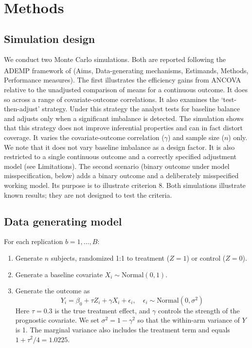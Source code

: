 \documentclass[
  11pt,
]{article}
\providecommand{\tightlist}{%
  \setlength{\itemsep}{0pt}\setlength{\parskip}{0pt}}
\begin{document}
\section{Methods}\label{methods}

\subsection{Simulation design}\label{simulation-design}

We conduct two Monte Carlo simulations. Both are
reported following the ADEMP framework of\textsuperscript{} (Aims, Data-generating
mechanisms, Estimands, Methods, Performance measures).
The first illustrates the efficiency gains from ANCOVA
relative to the unadjusted comparison of means for a
continuous outcome. It does so across a range of
covariate-outcome correlations. It also examines the
`test-then-adjust' strategy. Under this strategy the
analyst tests for baseline balance and adjusts only
when a significant imbalance is detected. The
simulation shows that this strategy does not improve
inferential properties and can in fact distort
coverage. It varies the covariate-outcome correlation
(\(\gamma\)) and sample size (\(n\)) only. We note that it
does not vary baseline imbalance as a design factor. It
is also restricted to a single continuous outcome and a
correctly specified adjustment model (see Limitations).
The second scenario (binary outcome under model
misspecification, below) adds a binary outcome and a
deliberately misspecified working model. Its purpose is
to illustrate criterion 8. Both simulations illustrate
known results; they are not designed to test the
criteria.

\subsection{Data generating model}\label{data-generating-model}

For each replication \(b = 1, \ldots, B\):

\begin{enumerate}
\def\labelenumi{\arabic{enumi}.}
\tightlist
\item
  Generate \(n\) subjects, randomized 1:1 to treatment
  (\(Z = 1\)) or control (\(Z = 0\)).
\item
  Generate a baseline covariate
  \(X_i \sim \text{Normal}(0, 1)\).
\item
  Generate the outcome as
  \[Y_i = \beta_0 + \tau Z_i + \gamma X_i +
  \epsilon_i, \quad \epsilon_i \sim
  \text{Normal}(0, \sigma^2)\]
  Here \(\tau = 0.3\) is the true treatment effect, and
  \(\gamma\) controls the strength of the prognostic
  covariate. We set \(\sigma^2 = 1 - \gamma^2\) so that
  the within-arm variance of \(Y\) is 1. The marginal
  variance also includes the treatment term and equals
  \(1 + \tau^2/4 = 1.0225\).
\end{enumerate}
\end{document}
